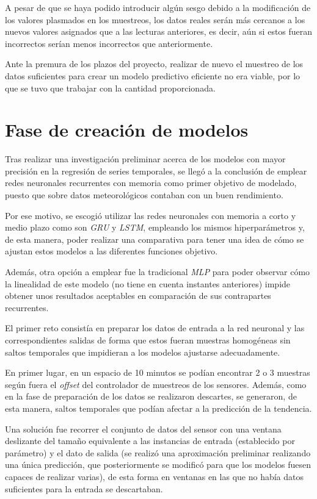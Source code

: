 A pesar de que se haya podido introducir algún sesgo debido a la modificación de los valores plasmados en los muestreos, 
los datos reales serán más cercanos a los nuevos valores asignados que a las lecturas anteriores, es decir, aún si 
estos fueran incorrectos serían menos incorrectos que anteriormente.

Ante la premura de los plazos del proyecto, realizar de nuevo el muestreo de los datos suficientes para crear un modelo predictivo
eficiente no era viable, por lo que se tuvo que trabajar con la cantidad proporcionada.

\section{Fase de creación de modelos}
Tras realizar una investigación preliminar acerca de los modelos con mayor precisión 
en la regresión de series temporales, se llegó a la conclusión de emplear
redes neuronales recurrentes con memoria como primer objetivo de modelado, 
puesto que sobre datos meteorológicos contaban con un buen rendimiento.

Por ese motivo, se escogió utilizar las redes neuronales con memoria a corto y medio
plazo como son \textit{GRU} y \textit{LSTM}, empleando los mismos hiperparámetros y,
de esta manera, poder realizar una comparativa para tener una idea de cómo se 
ajustan estos modelos a las diferentes funciones objetivo.

Además, otra opción a emplear fue la tradicional \textit{MLP} para poder observar
cómo la linealidad de este modelo (no tiene en cuenta instantes anteriores) impide obtener unos 
resultados aceptables en comparación de sus contrapartes recurrentes.

El primer reto consistía en preparar los datos de entrada a la red neuronal y las 
correspondientes salidas de forma que estos fueran muestras homogéneas
sin saltos temporales que impidieran a los modelos ajustarse adecuadamente.

En primer lugar, en un espacio de 10 minutos se podían encontrar 2 o 3 muestras según fuera 
el \textit{offset} del controlador de muestreos de los sensores.
Además, como en la fase de preparación de los datos se realizaron descartes, se generaron, de esta manera,
saltos temporales que podían afectar a la predicción de la tendencia.

Una solución fue recorrer el conjunto de datos del sensor con una ventana deslizante del tamaño
equivalente a las instancias de entrada (establecido por parámetro) y el dato de salida (se realizó una 
aproximación preliminar realizando una única predicción, que posteriormente se modificó para 
que los modelos fuesen capaces de realizar varias), de esta forma en ventanas en las que 
no había datos suficientes para la entrada se descartaban.

